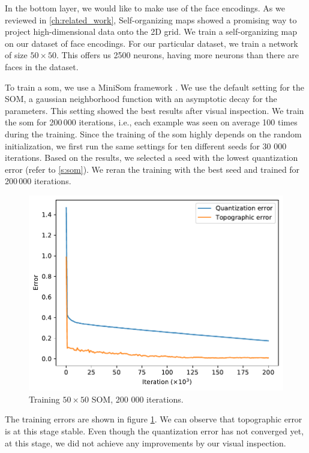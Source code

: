 In the bottom layer, we would like to make use of the face encodings. As we reviewed in \autoref{ch:related_work}, Self-organizing maps showed a promising way to project high-dimensional data onto the 2D grid. We train a self-organizing map on our dataset of face encodings. For our particular dataset, we train a network of size $50\times 50$. This offers us 2500 neurons, having more neurons than there are faces in the dataset.

To train a \acrshort{som}, we use a MiniSom framework \citep{vettigli2013minisom}. We use the default setting for the SOM, a gaussian neighborhood function with an asymptotic decay for the parameters. This setting showed the best results after visual inspection. We train the \acrshort{som} for 200\,000 iterations, i.e., each example was seen on average 100 times during the training. Since the training of the \acrshort{som} highly depends on the random initialization, we first run the same settings for ten different seeds for 30 000 iterations. Based on the results, we selected a seed with the lowest quantization error (refer to \autoref{s:som}). We reran the training with the best seed and trained for 200\,000 iterations.

\begin{figure}
    \centering
    \includegraphics[width=0.8\linewidth]{graphs/som_errors.pdf}
    \caption{Training $50\times50$ SOM, 200 000 iterations.}
    \label{fig:som_training}
\end{figure}

The training errors are shown in figure \ref{fig:som_training}. We can observe that topographic error is at this stage stable. Even though the quantization error has not converged yet, at this stage, we did not achieve any improvements by our visual inspection.

